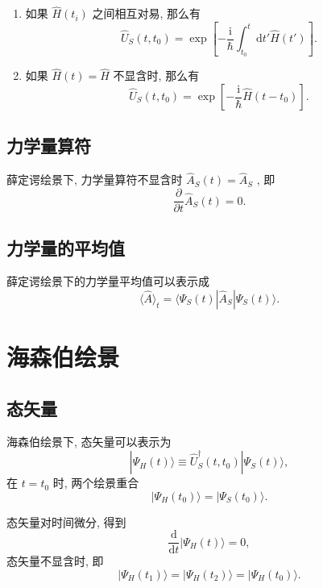 \begin{enumerate}
\item 如果 $\hat H(t_i)$ 之间相互对易, 那么有
\begin{equation}
   \hat U_S(t, t_0)=\exp\left[ -\frac{\mathrm i}{\hbar}\int_{t_0}^{t}\mathrm dt'\hat H(t') \right]. 
\end{equation}
\item 如果 $\hat H(t)=\hat H$ 不显含时, 那么有
\begin{equation}
   \hat U_S(t, t_0)=\exp\left[ -\frac{\mathrm i}{\hbar} \hat H(t-t_0)\right]. 
\end{equation}
\end{enumerate}

\subsection{力学量算符}

薛定谔绘景下, 力学量算符不显含时 $\hat A_S(t)=\hat A_S$ , 即
\begin{equation}
   \frac{\partial}{\partial t}\hat A_S(t)=0. 
\end{equation}

\subsection{力学量的平均值}

薛定谔绘景下的力学量平均值可以表示成
\begin{equation}
   \langle \hat A\rangle_t=\langle \Psi_S(t)|\hat A_S|\Psi_S(t) \rangle. 
\end{equation}


\section{海森伯绘景}

\subsection{ 态矢量}

海森伯绘景下, 态矢量可以表示为
\begin{equation}
   |\Psi_H(t)\rangle\equiv \hat U_S^\dagger (t, t_0)|\Psi_S(t)\rangle, 
\end{equation}
在 $t=t_0$ 时, 两个绘景重合
\begin{equation}
   |\Psi_H(t_0)\rangle=|\Psi_S(t_0)\rangle. 
\end{equation}

态矢量对时间微分, 得到
\begin{equation}
   \frac{\mathrm d}{\mathrm d t}|\Psi_H(t)\rangle=0, 
\end{equation}
态矢量不显含时, 即 
\begin{equation}
   |\Psi_H(t_1)\rangle=|\Psi_H(t_2)\rangle=|\Psi_H(t_0)\rangle. 
\end{equation}


